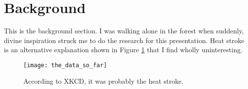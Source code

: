 \section{Background}

This is the background section. I was walking alone in the forest when suddenly, divine
inspiration struck me to do the research for this presentation. Heat stroke is an alternative explanation shown in Figure \ref{fig:bar-chart} that I find wholly uninteresting.
\begin{figure}[H]
  \centering
  \texttt{[image: the\_data\_so\_far]}
  \caption{According to XKCD, it was probably the heat stroke.}
  \label{fig:bar-chart}
\end{figure}
